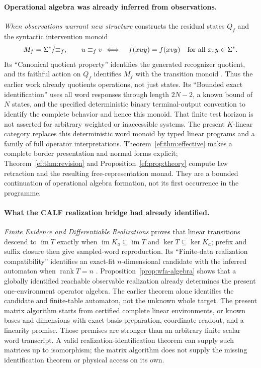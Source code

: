 \documentclass[11pt]{article}
\theoremstyle{definition}
\theoremstyle{remark}\newtheorem{remark}[theorem]{Remark}
\newcommand{\im}{\operatorname{im}}
\begin{document}
\paragraph{Operational algebra was already inferred from observations.}
\emph{When observations warrant new structure} constructs the residual
states $Q_f$ and the syntactic intervention monoid
\[
 M_f=\Sigma^*/{\equiv_f},\qquad
 u\equiv_f v\ \Longleftrightarrow\quad
 f(xuy)=f(xvy)\quad\hbox{for all }x,y\in\Sigma^*.
\]
Its ``Canonical quotient property'' identifies the generated recognizer
quotient, and its faithful action on $Q_f$ identifies $M_f$ with the
transition monoid \cite{observation-note}. Thus the earlier work already
quotients operations, not just states. Its ``Bounded exact identification''
uses all word responses through length $2N-2$, a known bound of $N$ states,
and the specified deterministic binary terminal-output convention to
identify the complete behavior and hence this monoid. That finite test
horizon is not asserted for arbitrary weighted or inaccessible systems.
The present $K$-linear category replaces this deterministic word monoid by
typed linear programs and a family of full operator interpretations.
Theorem~\ref{ef:thm:effective} makes a complete border presentation and
normal forms explicit; Theorem~\ref{ef:thm:revision} and
Proposition~\ref{ef:prop:theory} compute law retraction and the resulting
free-representation monad. They are a bounded continuation of operational
algebra formation, not its first occurrence in the programme.

\paragraph{What the CALF realization bridge had already identified.}
\emph{Finite Evidence and Differentiable Realizations} proves that linear
transitions descend to $\im T$ exactly when
$\im K_a\subseteq\im T$ and $\ker T\subseteq\ker K_a$; prefix and suffix
closure then give sampled-word reproduction. Its ``Finite-data realization
compatibility'' identifies an exact-fit $n$-dimensional candidate with the
inferred automaton when $\operatorname{rank}T=n$ \cite{bridge-note}.
Proposition~\ref{prop:wfa-algebra} shows that a globally identified reachable
observable realization already determines the present one-environment
operator algebra. The earlier theorem alone identifies the candidate and
finite-table automaton, not the unknown whole target. The present matrix
algorithm starts from certified complete linear environments, or known
bases and dimensions with exact basis preparation, coordinate readout,
and a linearity promise. Those premises are stronger than an arbitrary
finite scalar word transcript. A valid realization-identification theorem
can supply such matrices up to isomorphism; the matrix algorithm does not
supply the missing identification theorem or physical access on its own.
\end{document}
